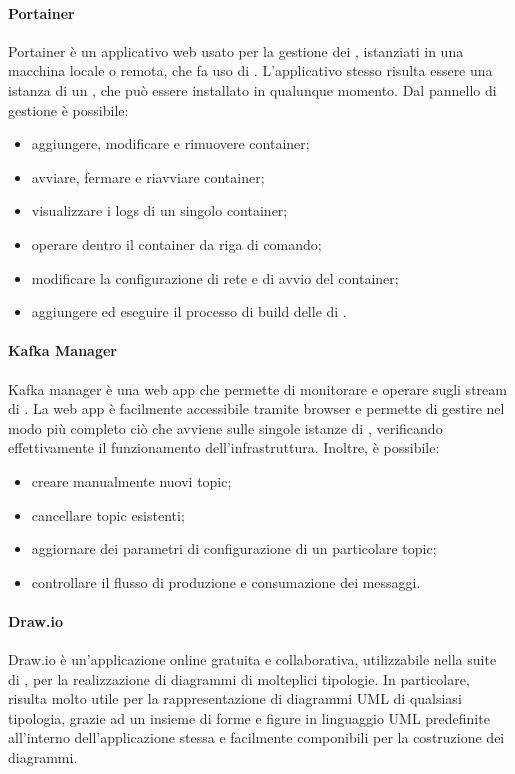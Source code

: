				\paragraph{Portainer}
					Portainer è un applicativo web usato per la gestione dei , istanziati in una macchina locale o remota, che fa uso di .
					\newline
					L'applicativo stesso risulta essere una istanza di un , che può essere installato in qualunque momento. Dal pannello di gestione è possibile:
					\begin{itemize}
						\item aggiungere, modificare e rimuovere container;
						\item avviare, fermare e riavviare container;
						\item visualizzare i logs di un singolo container;
						\item operare dentro il container da riga di comando;
						\item modificare la configurazione di rete e di avvio del container;
						\item aggiungere ed eseguire il processo di build delle  di . 
					\end{itemize}

				\paragraph{Kafka Manager}
					Kafka manager è una web app che permette di monitorare e operare sugli stream di .
					\newline
					La web app è facilmente accessibile tramite browser e permette di gestire nel modo più completo ciò che avviene sulle singole istanze di , verificando effettivamente il funzionamento dell'infrastruttura. Inoltre, è possibile:
					\begin{itemize}
					 	\item creare manualmente nuovi topic;
					 	\item cancellare topic esistenti;
					 	\item aggiornare dei parametri di configurazione di un particolare topic;
					 	\item controllare il flusso di produzione e consumazione dei messaggi.
					 \end{itemize} 
				
				\paragraph{Draw.io} 
					Draw.io è un'applicazione online gratuita e collaborativa, utilizzabile nella suite di , per la realizzazione di diagrammi di molteplici tipologie. 
					\newline
					In particolare, risulta molto utile per la rappresentazione di diagrammi UML di qualsiasi tipologia, grazie ad un insieme di forme e figure in linguaggio UML predefinite all'interno dell'applicazione stessa e facilmente componibili per la costruzione dei diagrammi.
				

